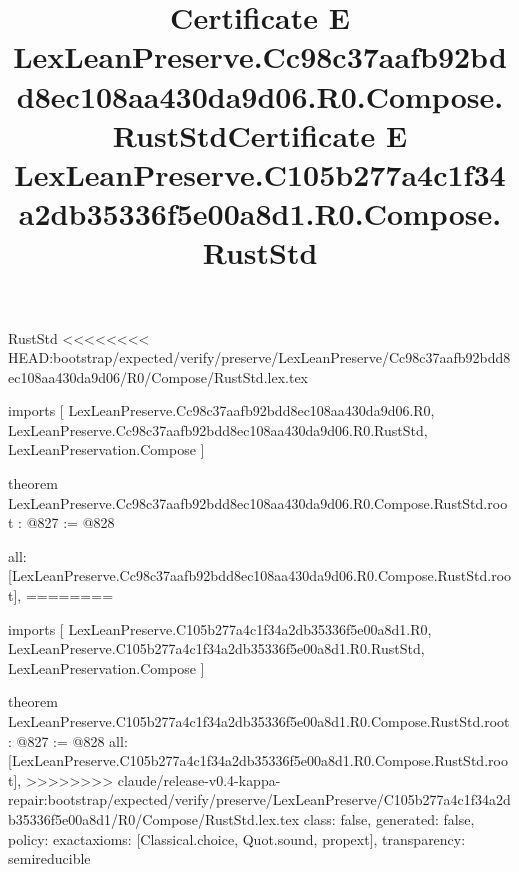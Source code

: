 \begin{lexlean}{RustStd}
<<<<<<<< HEAD:bootstrap/expected/verify/preserve/LexLeanPreserve/Cc98c37aafb92bdd8ec108aa430da9d06/R0/Compose/RustStd.lex.tex
\title{Certificate E LexLeanPreserve.Cc98c37aafb92bdd8ec108aa430da9d06.R0.Compose.RustStd}
\begin{coremodule}
imports [
  LexLeanPreserve.Cc98c37aafb92bdd8ec108aa430da9d06.R0,
  LexLeanPreserve.Cc98c37aafb92bdd8ec108aa430da9d06.R0.RustStd,
  LexLeanPreservation.Compose
]

theorem LexLeanPreserve.Cc98c37aafb92bdd8ec108aa430da9d06.R0.Compose.RustStd.root : @827 := @828 {
  all: [LexLeanPreserve.Cc98c37aafb92bdd8ec108aa430da9d06.R0.Compose.RustStd.root],
========
\title{Certificate E LexLeanPreserve.C105b277a4c1f34a2db35336f5e00a8d1.R0.Compose.RustStd}
\begin{coremodule}
imports [
  LexLeanPreserve.C105b277a4c1f34a2db35336f5e00a8d1.R0,
  LexLeanPreserve.C105b277a4c1f34a2db35336f5e00a8d1.R0.RustStd,
  LexLeanPreservation.Compose
]

theorem LexLeanPreserve.C105b277a4c1f34a2db35336f5e00a8d1.R0.Compose.RustStd.root : @827 := @828 {
  all: [LexLeanPreserve.C105b277a4c1f34a2db35336f5e00a8d1.R0.Compose.RustStd.root],
>>>>>>>> claude/release-v0.4-kappa-repair:bootstrap/expected/verify/preserve/LexLeanPreserve/C105b277a4c1f34a2db35336f5e00a8d1/R0/Compose/RustStd.lex.tex
  class: false,
  generated: false,
  policy: exact{axioms: [Classical.choice, Quot.sound, propext]},
  transparency: semireducible
}


\end{coremodule}}
\end{coremodule}
\end{lexlean}
